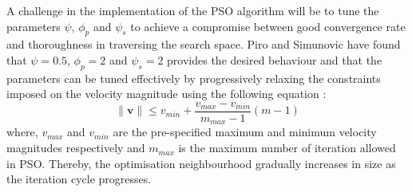 	A challenge in the implementation of the PSO algorithm will be to tune the parameters $\psi$, $\phi_p$ and $\psi_s$ to achieve a compromise between good convergence rate and thoroughness in traversing the search space. Piro and Simunovic \cite{Piro16} have found that $\psi=0.5$, $\phi_p=2$ and $\psi_s=2$ provides the desired behaviour and that the parameters can be tuned effectively by progressively relaxing the constraints imposed on the velocity magnitude using the following equation \cite{Nocedal06}:
	\begin{equation}\label{eq:PSOvel}
		\|\mathbf{v}\| \leq v_{min} + \frac{v_{max}-v_{min}}{m_{max} - 1} (m-1)
	\end{equation}
	where, $v_{max}$ and $v_{min}$ are the pre-specified maximum and minimum velocity magnitudes respectively and $m_{max}$ is the maximum number of iteration allowed in PSO. Thereby, the optimisation neighbourhood gradually increases in size as the iteration cycle progresses.

